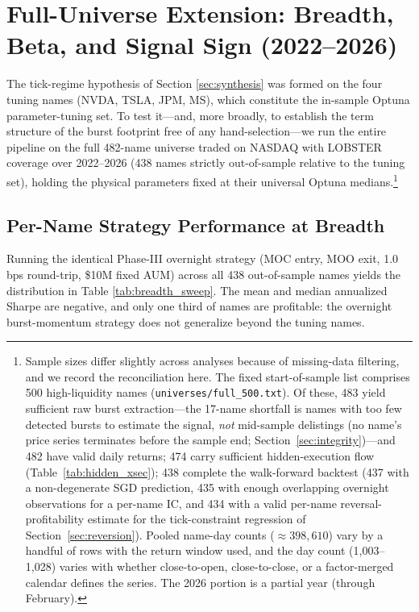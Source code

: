 \documentclass[11pt]{article}
\begin{document}
\section{Full-Universe Extension: Breadth, Beta, and Signal Sign (2022--2026)}
\label{sec:breadth}
The tick-regime hypothesis of Section \ref{sec:synthesis} was formed on the four tuning names (NVDA, TSLA, JPM, MS), which constitute the in-sample Optuna parameter-tuning set. To test it---and, more broadly, to establish the term structure of the burst footprint free of any hand-selection---we run the entire pipeline on the full 482-name universe traded on NASDAQ with LOBSTER coverage over 2022--2026 (438 names strictly out-of-sample relative to the tuning set), holding the physical parameters fixed at their universal Optuna medians.\footnote{Sample sizes differ slightly across analyses because of missing-data filtering, and we record the reconciliation here. The fixed start-of-sample list comprises 500 high-liquidity names (\texttt{universes/full\_500.txt}). Of these, 483 yield sufficient raw burst extraction---the 17-name shortfall is names with too few detected bursts to estimate the signal, \emph{not} mid-sample delistings (no name's price series terminates before the sample end; Section~\ref{sec:integrity})---and 482 have valid daily returns; 474 carry sufficient hidden-execution flow (Table~\ref{tab:hidden_xsec}); 438 complete the walk-forward backtest (437 with a non-degenerate SGD prediction, 435 with enough overlapping overnight observations for a per-name IC, and 434 with a valid per-name reversal-profitability estimate for the tick-constraint regression of Section~\ref{sec:reversion}). Pooled name-day counts (${\approx}398{,}610$) vary by a handful of rows with the return window used, and the day count (1{,}003--1{,}028) varies with whether close-to-open, close-to-close, or a factor-merged calendar defines the series. The 2026 portion is a partial year (through February).}

\subsection{Per-Name Strategy Performance at Breadth}
Running the identical Phase-III overnight strategy (MOC entry, MOO exit, 1.0 bps round-trip, \$10M fixed AUM) across all 438 out-of-sample names yields the distribution in Table \ref{tab:breadth_sweep}. The mean and median annualized Sharpe are negative, and only one third of names are profitable: the overnight burst-momentum strategy does not generalize beyond the tuning names.
\end{document}
